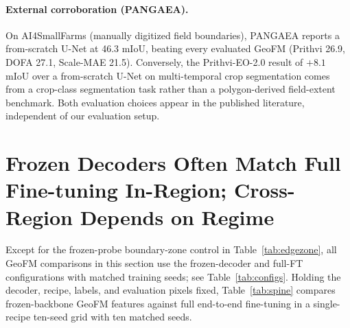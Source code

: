 \documentclass{article}
\begin{document}
\paragraph{External corroboration (PANGAEA).} On AI4SmallFarms \citep{ai4smallfarms}
(manually digitized field boundaries), PANGAEA \citep{pangaea} reports a from-scratch
U-Net at 46.3 mIoU, beating every evaluated GeoFM (Prithvi 26.9, DOFA 27.1, Scale-MAE
21.5). Conversely, the Prithvi-EO-2.0 result of $+8.1$ mIoU over a from-scratch
U-Net on multi-temporal crop segmentation \citep{prithvi} comes from a crop-class
segmentation task rather than a polygon-derived field-extent benchmark. Both evaluation choices appear in the published literature,
independent of our evaluation setup.

\FloatBarrier
{}
\section{Frozen Decoders Often Match Full Fine-tuning In-Region; Cross-Region Depends on Regime}
\label{sec:spine}
Except for the frozen-probe boundary-zone control in Table~\ref{tab:edgezone}, all GeoFM
comparisons in this section use the frozen-decoder and full-FT configurations with matched training seeds; see Table~\ref{tab:configs}.
Holding the decoder, recipe, labels, and evaluation pixels fixed, Table~\ref{tab:spine}
compares frozen-backbone GeoFM features against full end-to-end fine-tuning in a
single-recipe ten-seed grid with ten matched seeds.
\end{document}
